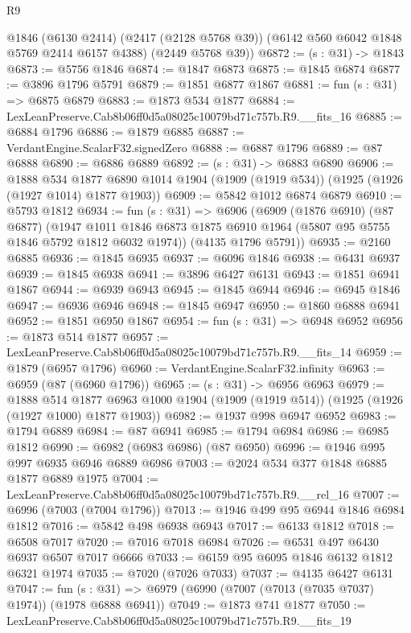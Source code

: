 \begin{lexlean}{R9}
\begin{coremodule}
      @1846
      (@6130 @2414)
      (@2417 (@2128 @5768 @39))
      (@6142 @560 @6042 @1848 @5769 @2414 @6157 @4388)
      (@2449 @5768 @39))
@6872 := (s : @31) -> @1843
@6873 := @5756 @1846
@6874 := @1847 @6873
@6875 := @1845 @6874
@6877 := @3896 @1796 @5791
@6879 := @1851 @6877 @1867
@6881 := fun (s : @31) => @6875 @6879
@6883 := @1873 @534 @1877
@6884 := LexLeanPreserve.Cab8b06ff0d5a08025c10079bd71c757b.R9.__fits_16
@6885 := @6884 @1796
@6886 := @1879 @6885
@6887 := VerdantEngine.ScalarF32.signedZero
@6888 := @6887 @1796
@6889 := @87 @6888
@6890 := @6886 @6889
@6892 := (s : @31) -> @6883 @6890
@6906 := @1888
    @534
    @1877
    @6890
    @1014
    @1904
    (@1909 (@1919 @534))
    (@1925 (@1926 (@1927 @1014) @1877 @1903))
@6909 := @5842 @1012 @6874 @6879
@6910 := @5793 @1812
@6934 := fun (s : @31) =>
  @6906
    (@6909
      (@1876 @6910)
      (@87 @6877)
      (@1947 @1011 @1846 @6873 @1875 @6910 @1964 (@5807 @95 @5755 @1846 @5792 @1812 @6032 @1974))
      (@4135 @1796 @5791))
@6935 := @2160 @6885
@6936 := @1845 @6935
@6937 := @6096 @1846
@6938 := @6431 @6937
@6939 := @1845 @6938
@6941 := @3896 @6427 @6131
@6943 := @1851 @6941 @1867
@6944 := @6939 @6943
@6945 := @1845 @6944
@6946 := @6945 @1846
@6947 := @6936 @6946
@6948 := @1845 @6947
@6950 := @1860 @6888 @6941
@6952 := @1851 @6950 @1867
@6954 := fun (s : @31) => @6948 @6952
@6956 := @1873 @514 @1877
@6957 := LexLeanPreserve.Cab8b06ff0d5a08025c10079bd71c757b.R9.__fits_14
@6959 := @1879 (@6957 @1796)
@6960 := VerdantEngine.ScalarF32.infinity
@6963 := @6959 (@87 (@6960 @1796))
@6965 := (s : @31) -> @6956 @6963
@6979 := @1888
    @514
    @1877
    @6963
    @1000
    @1904
    (@1909 (@1919 @514))
    (@1925 (@1926 (@1927 @1000) @1877 @1903))
@6982 := @1937 @998 @6947 @6952
@6983 := @1794 @6889
@6984 := @87 @6941
@6985 := @1794 @6984
@6986 := @6985 @1812
@6990 := @6982 (@6983 @6986) (@87 @6950)
@6996 := @1946 @995 @997 @6935 @6946 @6889 @6986
@7003 := @2024 @534 @377 @1848 @6885 @1877 @6889 @1975
@7004 := LexLeanPreserve.Cab8b06ff0d5a08025c10079bd71c757b.R9.__rel_16
@7007 := @6996 (@7003 (@7004 @1796))
@7013 := @1946 @499 @95 @6944 @1846 @6984 @1812
@7016 := @5842 @498 @6938 @6943
@7017 := @6133 @1812
@7018 := @6508 @7017
@7020 := @7016 @7018 @6984
@7026 := @6531 @497 @6430 @6937 @6507 @7017 @6666
@7033 := @6159 @95 @6095 @1846 @6132 @1812 @6321 @1974
@7035 := @7020 (@7026 @7033)
@7037 := @4135 @6427 @6131
@7047 := fun (s : @31) => @6979 (@6990 (@7007 (@7013 (@7035 @7037) @1974)) (@1978 @6888 @6941))
@7049 := @1873 @741 @1877
@7050 := LexLeanPreserve.Cab8b06ff0d5a08025c10079bd71c757b.R9.__fits_19

\end{coremodule}
\end{lexlean}
